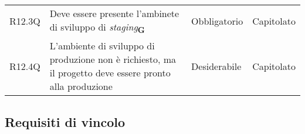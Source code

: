 \begin{center}
\begin{longtable}[!h]{p{50px} p{200px} p{100px} p{50px}}
        R12.3Q                                & Deve essere presente l'ambinete di sviluppo di \textit{staging}\textsubscript{\textbf{G}}                                                                                       & Obbligatorio             & Capitolato                   \\
        R12.4Q                                & L'ambiente di sviluppo di produzione non è richiesto, ma il progetto deve essere pronto alla produzione                                                                         & Desiderabile             & Capitolato                   \\
    \end{longtable}
\end{center}

\newpage
\subsection{Requisiti di vincolo}
